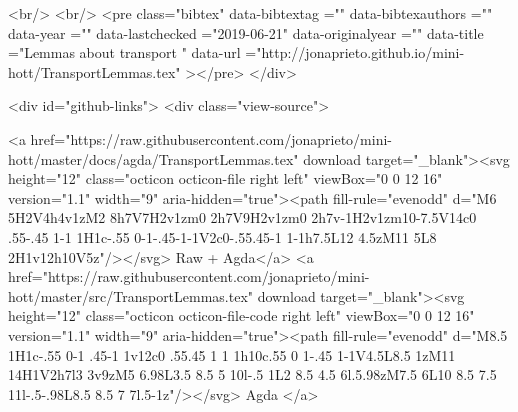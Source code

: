 {{  <br/>
  <br/>
  <pre class="bibtex"
       data-bibtextag =""
       data-bibtexauthors =""
       data-year =""
       data-lastchecked ="2019-06-21"
       data-originalyear =""
       data-title ="Lemmas about transport "
       data-url ="http://jonaprieto.github.io/mini-hott/TransportLemmas.tex"
  ></pre>
  </div>
  

  <div id="github-links">
    <div class="view-source">
      
        <a href="https://raw.githubusercontent.com/jonaprieto/mini-hott/master/docs/agda/TransportLemmas.tex" download target="_blank"><svg height="12" class="octicon octicon-file right left" viewBox="0 0 12 16" version="1.1" width="9" aria-hidden="true"><path fill-rule="evenodd" d="M6 5H2V4h4v1zM2 8h7V7H2v1zm0 2h7V9H2v1zm0 2h7v-1H2v1zm10-7.5V14c0 .55-.45 1-1 1H1c-.55 0-1-.45-1-1V2c0-.55.45-1 1-1h7.5L12 4.5zM11 5L8 2H1v12h10V5z"/></svg> Raw + Agda</a>
        <a href="https://raw.githubusercontent.com/jonaprieto/mini-hott/master/src/TransportLemmas.tex" download target="_blank"><svg height="12" class="octicon octicon-file-code right left" viewBox="0 0 12 16" version="1.1" width="9" aria-hidden="true"><path fill-rule="evenodd" d="M8.5 1H1c-.55 0-1 .45-1 1v12c0 .55.45 1 1 1h10c.55 0 1-.45 1-1V4.5L8.5 1zM11 14H1V2h7l3 3v9zM5 6.98L3.5 8.5 5 10l-.5 1L2 8.5 4.5 6l.5.98zM7.5 6L10 8.5 7.5 11l-.5-.98L8.5 8.5 7 7l.5-1z"/></svg> Agda </a>
      
}}
